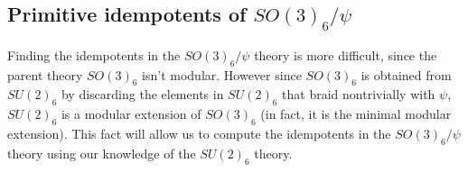 \subsection{Primitive idempotents of $SO(3)_6/\psi$}

Finding the idempotents in the $SO(3)_6/\psi$ theory is more difficult, since the parent theory $SO(3)_6$ isn't modular.
However since $SO(3)_6$ is obtained from $SU(2)_6$ by discarding the elements in $SU(2)_6$ 
that braid nontrivially with $\psi$, $SU(2)_6$ is a modular extension of $SO(3)_6$ (in fact, it is the minimal modular extension). 
This fact will allow us to compute the idempotents in the $SO(3)_6/\psi$ theory using our knowledge of the $SU(2)_6$ theory. 

